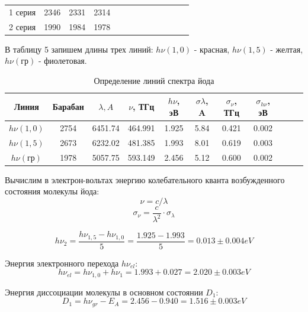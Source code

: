 \documentclass[14pt,a4paper]{scrartcl}
\begin{document}
			\begin{table}[h!]

		\begin{center}
			\begin{tabular}{|c|c|c|c|c|c|c|c|c|c|c|c|c|}
				\hline 
			1 серия & 2346 & 2331 & 2314 \\
		      
			2 серия & 1990 & 1984 & 1978 \\
				\hline 
			\end{tabular} 
		\end{center}
		\label{table_mn}
	\end{table}
	
	

В таблицу 5 запишем длины трех линий: $h\nu(1,0)$ - красная,  $ h\nu(1,5) $ - желтая, $ h\nu(\text{гр}) $ - фиолетовая.

		\begin{table}[h!]
		\caption{Определение линий спектра йода}
		\begin{center}
			\begin{tabular}{|c|c|c|c|c|c|c|c|c|c|c|}
				\hline 
				Линия & Барабан & $ \lambda, A$ & $ \nu $, ТГц & $h\nu$, эВ & $\sigma \lambda$, A & $\sigma_\nu$, ТГц & $\sigma_{h\nu}$, эВ \\ 
				\hline 
			$ h\nu(1,0) $ & 2754 & 6451.74 & 464.991 & 1.925 & 5.84 & 0.421 & 0.002 \\
		    $ h\nu(1,5) $  & 2673 & 6232.02 & 481.385 & 1.993 & 8.01 & 0.619 & 0.003\\
			$ h\nu(\text{гр}) $ & 1978 & 5057.75 & 593.149 & 2.456 & 5.12 & 0.600 & 0.002\\
				\hline 
			\end{tabular} 
		\end{center}
		\label{table_mn}
	\end{table}


\newpage


Вычислим в электрон-вольтах энергию колебательного кванта возбужденного состояния молекулы йода:
\[\nu = c / \lambda\]
\[\sigma_{\nu} = \frac{c}{\lambda^2}\cdot \sigma_{\lambda}\]

\[h\nu_2 =\frac{h\nu_{1,5} - h\nu_{1, 0}}{5} = \frac{1.925-1.993}{5}=0.013\pm 0.004eV\]

Энергия электронного перехода $h\nu_{el}$:
\[ h\nu_{el} = h\nu_{1,0}+h\nu_1 = 1.993+0.027 = 2.020\pm0.003eV\]


Энергия диссоциации молекулы в основном состоянии $D_1$:
\[D_1 = h\nu_{gr} - E_A = 2.456-0.940=1.516\pm0.003eV\]
\end{document}
